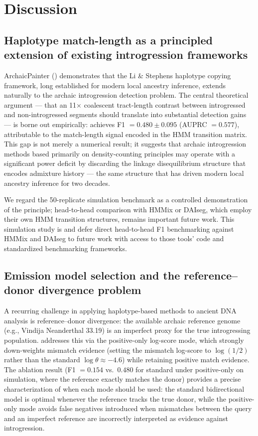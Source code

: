 \section*{Discussion}

\subsection*{Haplotype match-length as a principled extension of existing introgression frameworks}

ArchaicPainter (\AP{}) demonstrates that the Li \& Stephens haplotype copying
framework, long established for modern local ancestry inference, extends naturally
to the archaic introgression detection problem.
The central theoretical argument --- that an 11$\times$ coalescent tract-length
contrast between introgressed and non-introgressed segments should translate into
substantial detection gains --- is borne out empirically: \AP{} achieves F1 $=
0.480 \pm 0.095$ (AUPRC $= 0.577$), attributable to the match-length
signal encoded in the HMM transition matrix.
This gap is not merely a numerical result; it suggests that archaic introgression
methods based primarily on density-counting principles may operate with a
significant power deficit by discarding the linkage disequilibrium structure
that encodes admixture history --- the same structure that has driven
modern local ancestry inference for two decades.

We regard the 50-replicate simulation benchmark as a controlled demonstration
of the principle; head-to-head comparison with HMMix or DAIseg, which employ
their own HMM transition structures, remains important future work.
This simulation study is
and defer direct head-to-head F1 benchmarking against HMMix and DAIseg to
future work with access to those tools' code and standardized benchmarking
frameworks.

\subsection*{Emission model selection and the reference--donor divergence problem}

A recurring challenge in applying haplotype-based methods to ancient DNA analysis
is reference--donor divergence: the available archaic reference genome (e.g.,
Vindija Neanderthal 33.19) is an imperfect proxy for the true introgressing
population.
\AP{} addresses this via the positive-only log-score mode, which strongly
down-weights mismatch evidence (setting the mismatch log-score to $\log(1/2)$
rather than the standard $\log\theta \approx -4.6$) while retaining positive
match evidence.
The ablation result (F1 $= 0.154$ vs.\ $0.480$ for standard under positive-only on
simulation, where the reference exactly matches the donor) provides a precise
characterization of when each mode should be used: the standard bidirectional model
is optimal whenever the reference tracks the true donor, while the positive-only mode
avoids false negatives introduced when mismatches between the query and an imperfect
reference are incorrectly interpreted as evidence against introgression.

